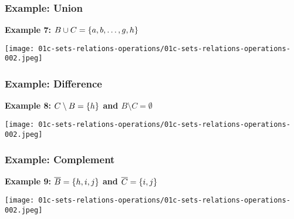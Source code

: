 \documentclass[fleqn,10pt,serif,xcolor=svgnames,xcolor=table,aspectratio=169]{beamer}
\begin{document}
\begin{frame}
  \frametitle{Example: Union}

  \hfill \textbf{Example 7: $B \cup C = \left\{a, b , \dots, g, h\right\}$}

  \bigskip

  \hfill \texttt{[image: 01c-sets-relations-operations/01c-sets-relations-operations-002.jpeg]}

\end{frame}

\begin{frame}
  \frametitle{Example: Difference}

  \hfill \textbf{Example 8: $C \setminus B = \left\{h\right\}$ and $B \setminus C = \emptyset$} \\

  \bigskip

  \hfill \texttt{[image: 01c-sets-relations-operations/01c-sets-relations-operations-002.jpeg]}

\end{frame}

\begin{frame}
  \frametitle{Example: Complement}

  \hfill \textbf{Example 9: $\overline{B} = \left\{h, i , j\right\}$ and $\overline{C} = \left\{i,j\right\}$} \\

  \bigskip

  \hfill \texttt{[image: 01c-sets-relations-operations/01c-sets-relations-operations-002.jpeg]}

\end{frame}
\end{document}
